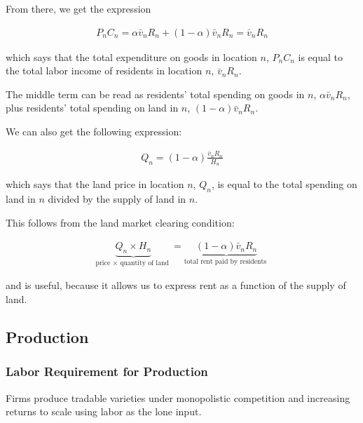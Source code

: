\documentclass[10pt]{article}
\begin{document}
From there, we get the expression

\begin{align}
    P_n C_n=\alpha \bar{v}_n R_n+(1-\alpha) \bar{v}_n R_n=\bar{v}_n R_n \label{eq:land_and_local_consumption}
\end{align}

which says that the 
total expenditure on goods in location $n$, $P_n C_n$
is equal to the total labor income of 
residents in location $n$, $\bar{v}_n R_n$.

The middle term can be read as 
residents' total spending on goods in $n$,
$\alpha \bar{v}_n R_n$, plus 
residents' total spending on land in $n$,
$(1-\alpha) \bar{v}_n R_n$.

We can also get the following expression:

\begin{align}
    Q_n=(1-\alpha) \frac{\bar{v}_n R_n}{H_n} \label{eq:land_market_clearing2}
\end{align}

which says that 
the land price in location $n$, $Q_n$,
is equal to the total spending on land in $n$ 
divided by the supply of land in $n$.

This follows from the land market clearing condition:

\begin{align}
    \underbrace{Q_n \times H_n}_{\text {price } \times \text { quantity of land }}=\underbrace{(1-\alpha) \bar{v}_n R_n}_{\text {total rent paid by residents }} \label{eq:land_market_clearing}
\end{align}

and is useful, because it allows us to express 
rent as a function of the supply of land.

\subsection{Production}

\subsubsection{Labor Requirement for Production}

Firms produce tradable varieties under 
monopolistic competition
and increasing returns to scale
using labor as the lone input. 
\end{document}
